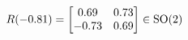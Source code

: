 \documentclass[preview]{standalone}
\begin{document}
\begin{align*}
\special{dvisvgm:raw <g id='unique000'>}R(-0.81) = \begin{bmatrix} 0.69 & 0.73 \\ -0.73 & 0.69 \end{bmatrix} \in \text{SO}(2)\special{dvisvgm:raw </g>}
\end{align*}
\end{document}
